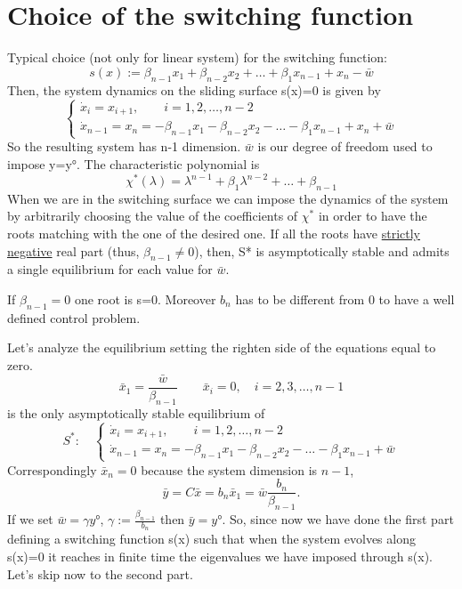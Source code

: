 \section{Choice of the switching function}
Typical choice (not only for linear system) for the switching function: 
\[
s(x):=\beta_{n-1}x_1+\beta_{n-2}x_2+\dots+\beta_1x_{n-1}+x_n-\bar{w}
\]
 Then, the system dynamics on the sliding surface s(x)=0 is given by 
\[
\begin{cases}
	\dot{x}_i=x_{i+1},\qquad i=1,2,\dots,n-2\\
	\dot{x}_{n-1}=x_n=-\beta_{n-1}x_1-\beta_{n-2}x_2-\dots-\beta_1x_{n-1}+x_n+\bar{w}
\end{cases}
\]So the resulting system has n-1 dimension. $\bar{w}$ is our degree of freedom used to impose y=y°. The characteristic polynomial is 
\[
\chi^*(\lambda)=\lambda^{n-1}+\beta_1\lambda^{n-2}+\dots+\beta_{n-1}
\]
When we are in the switching surface we can impose the dynamics of the system by arbitrarily choosing the value of the coefficients of $\chi^*$ in order to have the roots matching with the one of the desired one. If all the roots have \underline{strictly negative} real part (thus, $\beta_{n-1}\neq0$), then, S* is asymptotically stable and admits a single equilibrium for each value for $\bar{w}$.
\begin{note}
	If $\beta_{n-1}=0$ one root is s=0. Moreover $b_n$ has to be different from 0 to have a well defined control problem.
\end{note}
Let's analyze the equilibrium setting the righten side of the equations equal to zero.
\[
\bar{x}_1=\frac{\bar{w}}{\beta_{n-1}}\qquad \bar{x}_i=0,\quad i=2,3,\dots,n-1
\] is the only asymptotically stable equilibrium of \[
S^*:\quad \begin{cases}
	\dot{x}_i=x_{i+1},\qquad i=1,2,\dots,n-2\\
	\dot{x}_{n-1}=x_n=-\beta_{n-1}x_1-\beta_{n-2}x_2-\dots-\beta_1x_{n-1}+\bar{w}
\end{cases}
\]Correspondingly $\bar{x}_n=0$ because the system dimension is $n-1$,
\[
	\bar{y}=C\bar{x}=b_n\bar{x}_1=\bar{w}\frac{b_n}{\beta_{n-1}}.
\]If we set $\bar{w}=\gamma y°$, $\gamma:=\frac{\beta_{n-1}}{b_n}$ then $\bar{y}=y°$.
So, since now we have done the first part defining a switching function s(x)  such that when the system evolves along s(x)=0 it reaches in finite time the eigenvalues we have imposed through s(x). Let's skip now to the second part.
